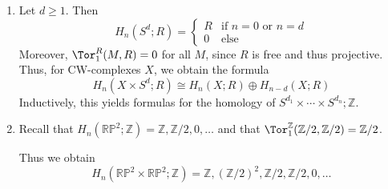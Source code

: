 \begin{example}
  \begin{enumerate}[1.]
    \item Let $d\geq 1$.
      Then
      \[
        H_n(S^d;R)
        =
        \begin{cases}
          R & \text{if $n=0$ or  $n=d$} \\
          0 & \text{else}
        \end{cases}
      \]
      Moreover, $\Tor_1^R(M,R) = 0$ for all $M$,
      since $R$ is free and thus projective.
      Thus, for CW-complexes $X$, we obtain the formula
       \[
        H_n( X \times S^d ; R)
        \cong
        H_n(X ; R)
        \oplus
        H_{n-d}(X;R)
      \]
      Inductively, this yields formulas for the homology
      of $S^{d_1} \times  \dotsb \times S^{d_n};\mathbb{Z}$.
    \item Recall that
      $H_n(\mathbb{R}\mathbb{P}^2;\mathbb{Z}) = \mathbb{Z}, \mathbb{Z} /2, 0, \ldots$
      and that $\Tor_1^{\mathbb{Z}}( \mathbb{Z}/2, \mathbb{Z}/2 ) = \mathbb{Z}/2$.

      Thus we obtain
      \[
        H_n(\mathbb{R}\mathbb{P}^2 \times \mathbb{R}\mathbb{P}^2; \mathbb{Z})
        =
        \mathbb{Z}, ( \mathbb{Z}/2)^2, \mathbb{Z}/2, \mathbb{Z}/2,0,\ldots
      \] 
  \end{enumerate}
\end{example}
